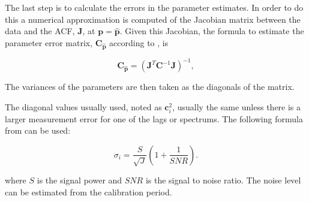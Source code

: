 The last step is to calculate the errors in the parameter estimates. In order to do this a numerical approximation is computed of the Jacobian matrix between the data and the ACF, $\mathbf{J}$, at $\mathbf{p}=\mathbf{\hat{p}}$. Given this Jacobian, the formula to estimate the parameter error matrix, $\mathbf{C}_{\mathbf{\hat{p}}}$ according to \cite{Hysell:2000cq}, is

\begin{equation}
\label{eqn:jacinv}
\mathbf{C}_{\mathbf{\hat{p}}}=(\mathbf{J}^T \mathbf{C}^{-1}\mathbf{J})^{-1},
\end{equation}

\noindent  The variances of the parameters are then taken as the diagonals of the matrix. 

%
%



The diagonal values usually used, noted as $\mathbf{c}_i^2$, usually the same unless there is a larger measurement error for one of the lags or spectrums. The following formula from  \cite{nicollsisrschool2013} can be used:

\begin{equation}
\label{sigpow}
\sigma_i = \frac{S}{\sqrt{J}}\left(1+\frac{1}{SNR}\right).
\end{equation}

\noindent where $S$ is the signal power and $SNR$ is the signal to noise ratio. The noise level can be estimated from the calibration period. 

